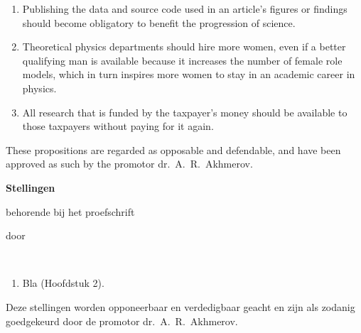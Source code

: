 \documentclass{dissertation}
\begin{document}
\begin{enumerate}
\item Publishing the data and source code used in an article's figures or findings should become obligatory to benefit the progression of science.

\item Theoretical physics departments should hire more women, even if a better qualifying man is available because it increases the number of female role models, which in turn inspires more women to stay in an academic career in physics.

\item All research that is funded by the taxpayer's money should be available to those taxpayers without paying for it again.


\end{enumerate}

\bigskip
\bigskip

\begin{center}
These propositions are regarded as opposable and defendable, and have been approved as such by the promotor  dr.\ A.\ R.\ Akhmerov.
\end{center}

\clearpage
{

\begin{center}

{\Large\titlefont\bfseries Stellingen}

\medskip

behorende bij het proefschrift

\medskip

{\makeatletter
\titlestyle\bfseries\large\@title
\makeatother}

{\makeatletter
\ifx\@subtitle\undefined\else
    \titlefont\titleshape\@subtitle
\fi
\makeatother}

\medskip

door

\medskip

\makeatletter
{\large\titlefont\bfseries\@firstname\ {\titleshape\@lastname}}
\makeatother

\end{center}

\smallskip

\begin{enumerate}
\itemsep-0.08em

\item Bla (Hoofdstuk 2).


\end{enumerate}

\smallskip

\begin{center}
Deze stellingen worden opponeerbaar en verdedigbaar geacht en zijn als zodanig goedgekeurd door de promotor dr.\ A.\ R.\ Akhmerov.
\end{center}

}
\end{document}
